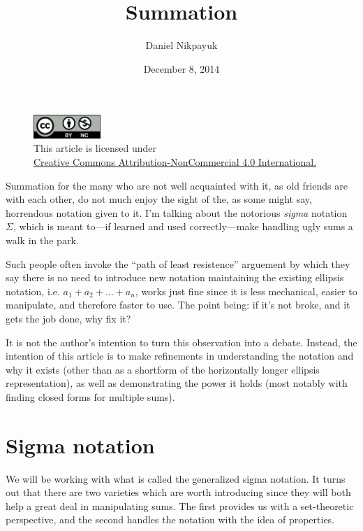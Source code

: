 \documentclass[twoside]{article}
\title{Summation}
\author{Daniel Nikpayuk}
\date{December 8, 2014}
\begin{document}
\maketitle

\begin{figure}[h]
\centering
\includegraphics[width=1in]{cc-by-nc.png}\\[0.1in]
\tiny This article is licensed under \\
\href{http://creativecommons.org/licenses/by-nc/4.0/}
{Creative Commons Attribution-NonCommercial 4.0 International.}\\[0.3in]
\end{figure}

Summation for the many who are not well acquainted with it, as 
old friends are with each other, do not much enjoy the sight of 
the, as some might say, horrendous notation given to it.  I'm 
talking about the notorious \emph{sigma} notation $  \Sigma  $, 
which is meant \mbox{to---if} learned and used 
\mbox{correctly---make} handling ugly sums a walk in the park.

Such people often invoke the ``path of least resistence'' 
arguement by which they say there is no need to introduce new 
notation maintaining the existing ellipsis notation, i.e. 
$  a_1+a_2+\ldots +a_n  $, works just fine since it is less 
mechanical, easier to manipulate, and therefore faster to use.  
The point being: if it's not broke, and it gets the job done,
why fix it?

It is not the author's intention to turn this observation into 
a debate.  Instead, the intention of this article is to make 
refinements in understanding the notation and why it exists 
(other than as a shortform of the horizontally longer ellipsis 
representation), as well as demonstrating the power it holds 
(most notably with finding closed forms for multiple sums).

\section{Sigma notation}

We will be working with what is called the generalized sigma
notation.  It turns out that there are two varieties which
are worth introducing since they will both help a great deal in
manipulating sums.  The first provides us with a
set-theoretic perspective, and the second handles the notation 
with the idea of properties. 
\end{document}

